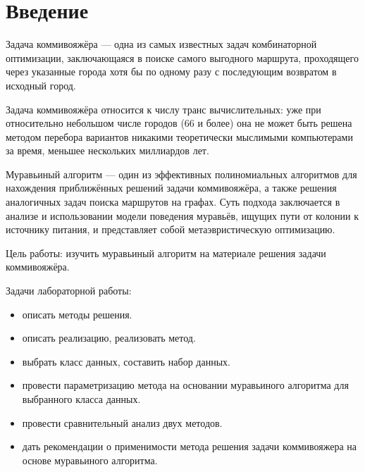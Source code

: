 \chapter*{\hfill{\centering Введение}\hfill}


Задача коммивояжёра — одна из самых известных задач комбинаторной оптимизации, заключающаяся в поиске самого выгодного маршрута, проходящего через указанные города хотя бы по одному разу с последующим возвратом в исходный город.

Задача коммивояжёра \cite{Mudrov} относится к числу транс вычислительных: уже при относительно небольшом числе городов (66 и более) она не может быть решена методом перебора вариантов никакими теоретически мыслимыми компьютерами за время, меньшее нескольких миллиардов лет.

Муравьиный алгоритм — один из эффективных полиномиальных алгоритмов для нахождения приближённых решений задачи коммивояжёра, а также решения аналогичных задач поиска маршрутов на графах.
Суть подхода заключается в анализе и использовании модели поведения муравьёв, ищущих пути от колонии к источнику питания, и представляет собой метаэвристическую оптимизацию.

Цель работы: изучить муравьиный алгоритм на материале решения задачи коммивояжёра.

Задачи лабораторной работы:
\begin{itemize}[label=---] 
	\item описать методы решения.
	\item описать реализацию, реализовать метод.
	\item выбрать класс данных, составить набор данных.
	\item провести параметризацию метода на основании муравьиного алгоритма для выбранного класса данных.
	\item провести сравнительный анализ двух методов.
	\item дать рекомендации о применимости метода решения задачи коммивояжера на основе муравьиного алгоритма.
\end{itemize}

